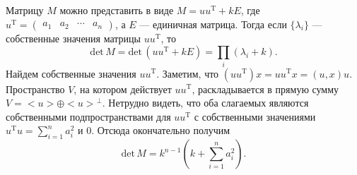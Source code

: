\documentclass{article}
\begin{document}
Матрицу $M$ можно представить в виде $M = uu^{\mathrm{T}} + kE$, где $u^{\mathrm{T}} = \begin{pmatrix}a_1&a_2&\cdots &a_n \end{pmatrix}$, а $E$ --- единичная матрица. Тогда если $\{\lambda_i\}$ --- собственные значения матрицы $uu^{\mathrm{T}}$, то $$\textrm{det}\, M = \textrm{det}\, (uu^{\mathrm{T}} + kE) = \prod\limits_i (\lambda_i + k).$$
Найдем собственные значения $uu^{\mathrm{T}}$. Заметим, что $(u u^{\mathrm{T}})x = u u^{\mathrm{T}} x = (u,x)u$. Пространство $V$, на котором действует $uu^{\mathrm{T}}$, 
раскладывается в прямую сумму $V = < u > \oplus {< u >}^\perp$. Нетрудно видеть, что оба слагаемых являются собственными подпространствами для 
$u u^{\mathrm{T}}$ с собственными значениями $u^{\mathrm{T}} u = \sum\limits_{i=1}^n a_i^2$ и $0$. Отсюда окончательно получим
$$\textrm{det}\, M = k^{n-1} \left( k + \sum_{i=1}^n a_i^2 \right).$$
\end{document}
